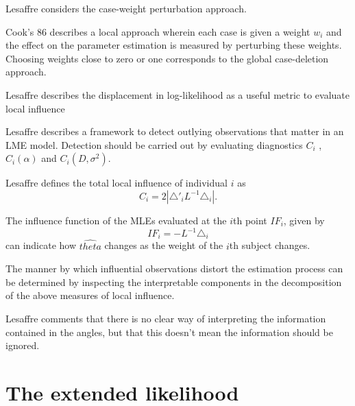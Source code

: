 \documentclass[MAIN.tex]{subfiles}
\begin{document}
Lesaffre considers the case-weight perturbation approach.


Cook's 86 describes a local approach wherein each case is given a
weight $w_{i}$ and the effect on the parameter estimation is
measured by perturbing these weights. Choosing weights close to
zero or one corresponds to the global case-deletion approach.


Lesaffre  describes the displacement in log-likelihood as a useful
metric to evaluate local influence %


Lesaffre describes a framework to detect outlying observations
that matter in an LME model. Detection should be carried out by
evaluating diagnostics $C_{i}$ , $C_{i}(\alpha)$ and $C_{i}(D,
\sigma^2)$.


Lesaffre defines the total local influence of individual $i$ as
\begin{equation}
C_{i} = 2 | \triangle \prime _{i} L^{-1} \triangle_{i}|.
\end{equation}



The influence function of the MLEs evaluated at the $i$th point
$IF_{i}$, given by
\begin{equation}
IF_{i} = -L^{-1}\triangle _{i}
\end{equation}
can indicate how $\hat{theta}$ changes as the weight of the $i$th
subject changes.




The manner by which influential observations
distort the estimation process can be determined by inspecting the
interpretable components in the decomposition of the above
measures of local influence.


Lesaffre comments that there is no clear way of interpreting the
information contained in the angles, but that this doesn't mean
the information should be ignored.










\section{The extended likelihood}
\end{document}
